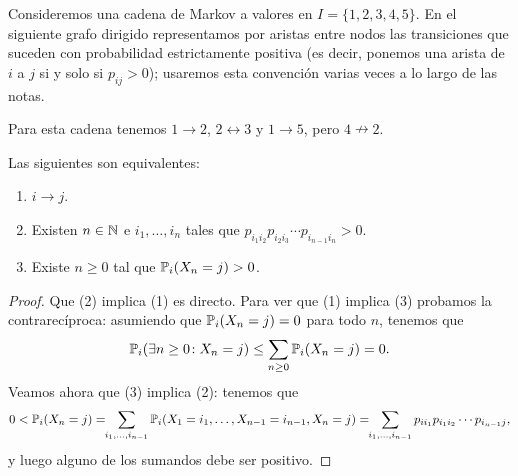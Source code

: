 \begin{ex}
Consideremos una cadena de Markov a valores en $I=\{1,2,3,4,5\}$.
En el siguiente grafo dirigido representamos por aristas entre nodos las transiciones que suceden con probabilidad estrictamente positiva (es decir, ponemos una arista de $i$ a $j$ si y solo si $p_{ij}>0$); usaremos esta convención varias veces a lo largo de las notas.
\begin{center}
\end{center}
Para esta cadena tenemos $1\to2$, $2\leftrightarrow3$ y $1\to5$, pero $4\nrightarrow2$.
\end{ex}

\begin{prop}
Las siguientes son equivalentes:
\begin{enumerate}[label=\uptext{(\arabic*)}]
\item $i\to j$.
\item Existen $n\in\mathbb{N}$ e $i_1,\dotsc,i_n$ tales que $p_{i_1i_2}p_{i_2i_3}\dotsm p_{i_{n-1}i_n}>0$.
\item Existe $n\geq0$ tal que $\mathbb{P}_i(X_n=j)>0$.
\end{enumerate}
\end{prop}

\begin{proof}

Que (2) implica (1) es directo.
Para ver que (1) implica (3) probamos la contrarecíproca: asumiendo que $\mathbb{P}_i(X_n=j)=0$ para todo $n$, tenemos que 
\[\mathbb{P}_i(\exists n\geq0\!:X_n=j)\leq\sum_{n\geq0}\mathbb{P}_i(X_n=j)=0.\]
Veamos ahora que (3) implica (2): tenemos que
\[0<\mathbb{P}_i(X_n=j)=\!\!\sum_{i_1,\dotsc,i_{n-1}}\mathbb{P}_i(X_1=i_1,\dotsc,X_{n-1}=i_{n-1},X_n=j)=\!\!\sum_{i_1,\dotsc,i_{n-1}}p_{ii_1}p_{i_1i_2}\dotsm p_{i_{n-1}j},\]
y luego alguno de los sumandos debe ser positivo.
\end{proof}

